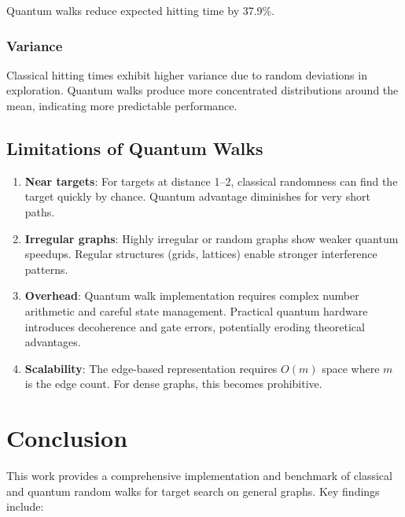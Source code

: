 \documentclass[12pt,a4paper]{article}
\begin{document}
Quantum walks reduce expected hitting time by 37.9\%.

\subsubsection{Variance}
Classical hitting times exhibit higher variance due to random deviations in exploration. Quantum walks produce more concentrated distributions around the mean, indicating more predictable performance.

\subsection{Limitations of Quantum Walks}

\begin{enumerate}
    \item \textbf{Near targets}: For targets at distance 1--2, classical randomness can find the target quickly by chance. Quantum advantage diminishes for very short paths.
    
    \item \textbf{Irregular graphs}: Highly irregular or random graphs show weaker quantum speedups. Regular structures (grids, lattices) enable stronger interference patterns.
    
    \item \textbf{Overhead}: Quantum walk implementation requires complex number arithmetic and careful state management. Practical quantum hardware introduces decoherence and gate errors, potentially eroding theoretical advantages.
    
    \item \textbf{Scalability}: The edge-based representation requires $O(m)$ space where $m$ is the edge count. For dense graphs, this becomes prohibitive.
\end{enumerate}

\section{Conclusion}

This work provides a comprehensive implementation and benchmark of classical and quantum random walks for target search on general graphs. Key findings include:
\end{document}
